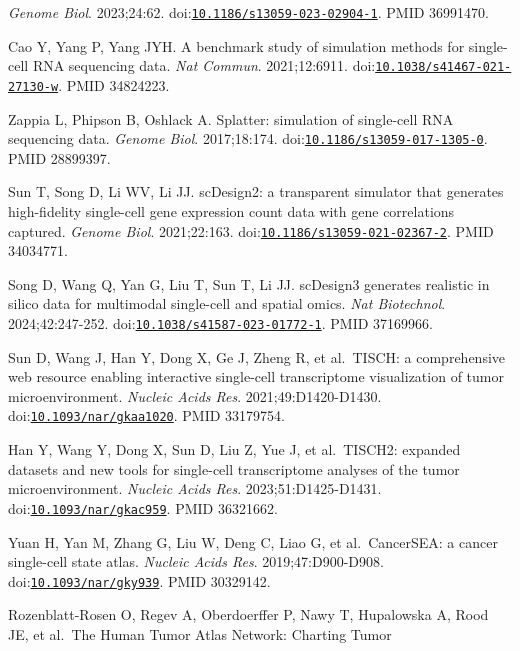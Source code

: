 \documentclass[11pt]{article}
\begin{document}
\begin{enumerate}[label={[\arabic*]},leftmargin=2.6em,labelsep=0.5em,itemsep=1.5pt]
  \emph{Genome Biol}. 2023;24:62.
  doi:\href{https://doi.org/10.1186/s13059-023-02904-1}{\nolinkurl{10.1186/s13059-023-02904-1}}.
  PMID 36991470.
\item
  Cao Y, Yang P, Yang JYH. A benchmark study of simulation methods for
  single-cell RNA sequencing data. \emph{Nat Commun}. 2021;12:6911.
  doi:\href{https://doi.org/10.1038/s41467-021-27130-w}{\nolinkurl{10.1038/s41467-021-27130-w}}.
  PMID 34824223.
\item
  Zappia L, Phipson B, Oshlack A. Splatter: simulation of single-cell
  RNA sequencing data. \emph{Genome Biol}. 2017;18:174.
  doi:\href{https://doi.org/10.1186/s13059-017-1305-0}{\nolinkurl{10.1186/s13059-017-1305-0}}.
  PMID 28899397.
\item
  Sun T, Song D, Li WV, Li JJ. scDesign2: a transparent simulator that
  generates high-fidelity single-cell gene expression count data with
  gene correlations captured. \emph{Genome Biol}. 2021;22:163.
  doi:\href{https://doi.org/10.1186/s13059-021-02367-2}{\nolinkurl{10.1186/s13059-021-02367-2}}.
  PMID 34034771.
\item
  Song D, Wang Q, Yan G, Liu T, Sun T, Li JJ. scDesign3 generates
  realistic in silico data for multimodal single-cell and spatial omics.
  \emph{Nat Biotechnol}. 2024;42:247-252.
  doi:\href{https://doi.org/10.1038/s41587-023-01772-1}{\nolinkurl{10.1038/s41587-023-01772-1}}.
  PMID 37169966.
\item
  Sun D, Wang J, Han Y, Dong X, Ge J, Zheng R, et al.~TISCH: a
  comprehensive web resource enabling interactive single-cell
  transcriptome visualization of tumor microenvironment. \emph{Nucleic
  Acids Res}. 2021;49:D1420-D1430.
  doi:\href{https://doi.org/10.1093/nar/gkaa1020}{\nolinkurl{10.1093/nar/gkaa1020}}.
  PMID 33179754.
\item
  Han Y, Wang Y, Dong X, Sun D, Liu Z, Yue J, et al.~TISCH2: expanded
  datasets and new tools for single-cell transcriptome analyses of the
  tumor microenvironment. \emph{Nucleic Acids Res}. 2023;51:D1425-D1431.
  doi:\href{https://doi.org/10.1093/nar/gkac959}{\nolinkurl{10.1093/nar/gkac959}}.
  PMID 36321662.
\item
  Yuan H, Yan M, Zhang G, Liu W, Deng C, Liao G, et al.~CancerSEA: a
  cancer single-cell state atlas. \emph{Nucleic Acids Res}.
  2019;47:D900-D908.
  doi:\href{https://doi.org/10.1093/nar/gky939}{\nolinkurl{10.1093/nar/gky939}}.
  PMID 30329142.
\item
  Rozenblatt-Rosen O, Regev A, Oberdoerffer P, Nawy T, Hupalowska A,
  Rood JE, et al.~The Human Tumor Atlas Network: Charting Tumor

\end{enumerate}
\end{document}
